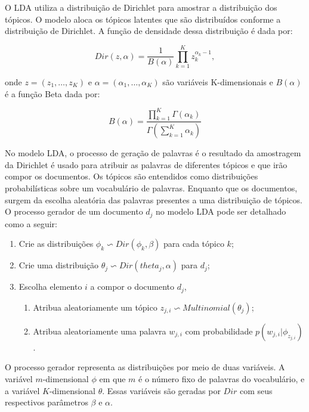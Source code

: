 O LDA utiliza a distribuição de Dirichlet para amostrar a distribuição dos tópicos. O modelo aloca os tópicos latentes que são distribuídos conforme a distribuição de Dirichlet. A função de densidade dessa distribuição é dada por:


\begin{equation}
Dir(z, \alpha) = \frac{1}{B(\alpha)} \prod_{k=1}^K z_k^{\alpha_k-1} , 
\end{equation}

onde $z = (z_1,\dots, z_K )$ e $\alpha = (\alpha_1,\dots,\alpha_K)$  são variáveis K-dimensionais e $B(\alpha)$ é a função Beta dada por:

\begin{equation}
	B(\alpha) = \frac{\prod_{k=1}^K \Gamma(\alpha_k)}{\Gamma(\sum_{k=1}^K \alpha_k)}
\end{equation} 



No modelo LDA, o processo de geração de palavras é o resultado da amostragem da Dirichlet é usado para atribuir as palavras de diferentes tópicos e que irão compor os documentos. 
%
Os tópicos são entendidos como distribuições probabilísticas sobre um vocabulário de palavras. Enquanto que os documentos, surgem da escolha aleatória das palavras presentes a uma distribuição de tópicos.
%
O processo gerador de um documento $d_j$ no modelo LDA pode ser detalhado como a seguir: 

\begin{enumerate}
	\item Crie as distribuições $\phi_k \backsim Dir(\phi_k, \beta)$ para cada tópico $k$;
	\item Crie uma distribuição $\theta_j \backsim Dir(theta_j,\alpha)$ para $d_j$;
	\item Escolha elemento $i$ a compor o documento $d_j$,
		\begin{enumerate}
			\item Atribua aleatoriamente um tópico $z_{j,i}\backsim Multinomial(\theta_j)$;
			\item Atribua aleatoriamente uma palavra $w_{j,i}$ com probabilidade $p(w_{j,i}|\phi_{z_{j,i}})$.
		\end{enumerate}
	
\end{enumerate}


O processo gerador representa as distribuições por meio de duas variáveis. A variável $m$-dimensional $\phi$ em que $m$ é o número fixo de palavras do vocabulário, e a variável $K$-dimensional $\theta$. Essas variáveis são geradas por $Dir$ com seus respectivos parâmetros $\beta$ e $\alpha$.

